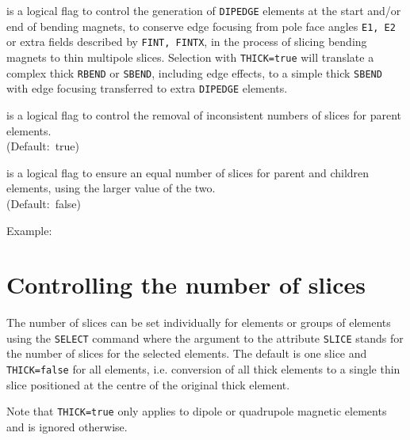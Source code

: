 \begin{madlist}
    is a logical flag to control the generation of
   {\tt DIPEDGE} elements at the start and/or end of bending magnets,
   to conserve edge focusing from pole face angles {\tt E1, E2}
   or extra fields described by {\tt FINT, FINTX}, in the
   process of slicing bending magnets to thin multipole slices.   
   Selection with {\tt THICK=true} will translate a complex thick 
   {\tt RBEND} or {\tt SBEND}, including edge effects, to a simple
   thick {\tt SBEND} with edge focusing transferred to extra 
   {\tt DIPEDGE} elements. \\ 


\begin{5.02.04}
    is a logical flag to control the removal of
   inconsistent numbers of slices for parent elements. \\
   (Default:~true)

    is a logical flag to ensure an equal number of slices
   for parent and children elements, using the larger value of the two. \\
   (Default:~false)
\\ \end{5.02.04}
\end{madlist}


   Example:
   
   

\section{Controlling the number of slices}

The number of slices can be set individually for elements or groups of
elements using the {\tt SELECT} command
where the argument to the attribute {\tt SLICE} stands for the number of
slices for the selected elements. The default is one slice and
{\tt THICK=false} for all elements, i.e. conversion of all thick
elements to a single thin slice positioned at the centre of the original
thick element.

Note that {\tt THICK=true} only applies to dipole or quadrupole magnetic
elements and is ignored otherwise.

